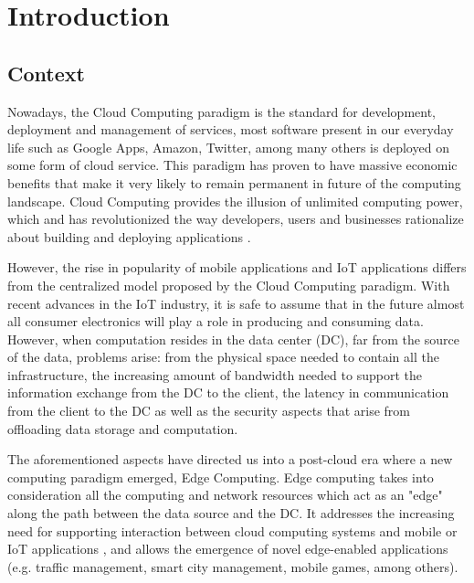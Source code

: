 \newcommand{\novathesis}{\emph{novathesis}}
\newcommand{\novathesisclass}{\texttt{novathesis.cls}}



\chapter{Introduction}
\label{cha:introduction}

\section{Context}

Nowadays, the Cloud Computing paradigm is the standard for development, deployment and management of services, most software present in our everyday life such as Google Apps, Amazon, Twitter, among many others is deployed on some form of cloud service. This paradigm has proven to have massive economic benefits that make it very likely to remain permanent in future of the computing landscape. Cloud Computing provides the illusion of unlimited computing power, which and has revolutionized the way developers, users and businesses rationalize about building and deploying applications \cite{10.1145/1721654.1721672}.

However, the rise in popularity of mobile applications and IoT applications differs from the centralized model proposed by the Cloud Computing paradigm. With recent advances in the IoT industry, it is safe to assume that in the future almost all consumer electronics will play a role in producing and consuming data. However, when computation resides in the data center (DC), far from the source of the data, problems arise: from the physical space needed to contain all the infrastructure, the increasing amount of bandwidth needed to support the information exchange from the DC to the client, the latency in communication from the client to the DC as well as the security aspects that arise from offloading data storage and computation.

The aforementioned aspects have directed us into a post-cloud era where a new computing paradigm emerged, Edge Computing. Edge computing takes into consideration all the computing and network resources which act as an "edge" along the path between the data source and the DC. It addresses the increasing need for supporting interaction between cloud computing systems and mobile or IoT applications \cite{iot_journal_shi_weisong_and_cao}, and allows the emergence of novel edge-enabled applications (e.g. traffic management, smart city management, mobile games, among others).

